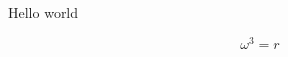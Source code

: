 \documentclass[a4paper,12pt]{article}
\begin{document}
Hello world

\begin{equation}
\omega^3=r
\end{equation}
\end{document}
